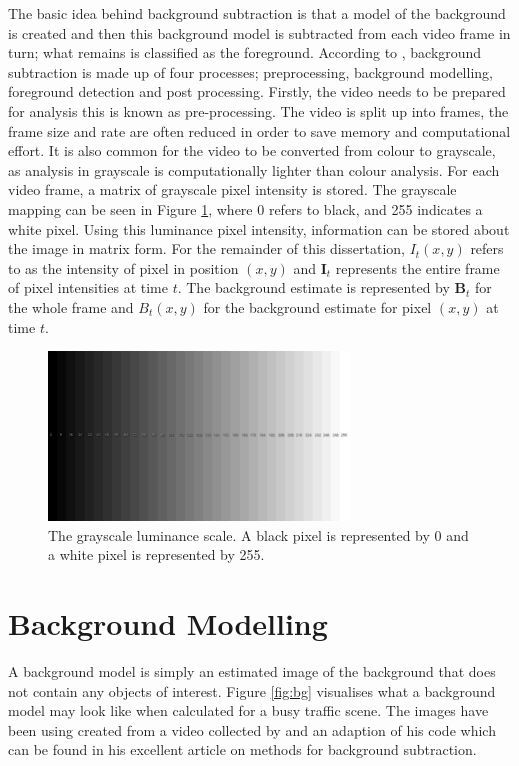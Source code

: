 The basic idea behind background subtraction is that a model of the background is created and then this background model is subtracted from each video frame in turn; what remains is classified as the foreground. According to \cite{parks2008evaluation}, background subtraction is made up of four processes; preprocessing, background modelling, foreground detection and post processing. Firstly, the video needs to be prepared for analysis this is known as pre-processing. The video is split up into frames, the frame size and rate are often reduced in order to save memory and computational effort. It is also common for the video to be converted from colour to grayscale, as analysis in grayscale is computationally lighter than colour analysis. For each video frame, a matrix of grayscale pixel intensity is stored. The grayscale mapping can be seen in Figure \ref{fig:grayscale}, where 0 refers to black, and 255 indicates a white pixel. Using this luminance pixel intensity, information can be stored about the image in matrix form. For the remainder of this dissertation, $I_t(x,y)$ refers to as the intensity of pixel in position $(x,y)$ and $\pmb{I}_t$ represents the entire frame of pixel intensities at time $t$. The background estimate is represented by $\pmb{B}_t$ for the whole frame and ${B_t(x,y)}$ for the background estimate for pixel $(x,y)$ at time $t$. 

\begin{figure}[h]
  \centering
  \includegraphics[width = 8cm]{grayscale.JPG}
  \caption{The grayscale luminance scale. A black pixel is represented by 0 and a white pixel is represented by 255.}
  \label{fig:grayscale}
\end{figure}


\section{Background Modelling}
\label{sec:background-modelling}
A background model is simply an estimated image of the background that does not contain any objects of interest. Figure \ref{fig:bg} visualises what a background model may look like when calculated for a busy traffic scene. The images have been using created from a video collected by \cite{benton2008background} and an adaption of his code which can be found in his excellent article on methods for background subtraction.   

